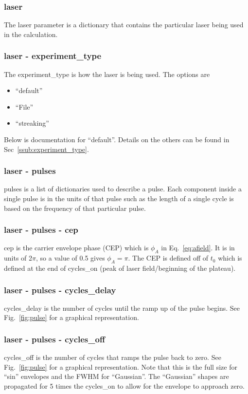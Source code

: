 \documentclass{article}
\begin{document}
\subsubsection{laser}
\label{ssub:laser_parameter}
The laser parameter is a dictionary that contains the particular laser being used in the calculation.

\subsubsection{laser - experiment\_type}
The experiment\_type is how the laser is being used. The options are
\begin{itemize}
  \item ``default''
  \item ``File''
  \item ``streaking''
\end{itemize}
Below is documentation for ``default''. Details on the others can be found in Sec~\ref{ssub:experiment_type}.

\subsubsection{laser - pulses}
pulses is a list of dictionaries used to describe a pulse. Each component inside a single pulse is in the units of that pulse such as the length of a single cycle is based on the frequency of that particular pulse.

\subsubsection{laser - pulses - cep}
cep is the carrier envelope phase (CEP) which is $\phi_A$ in Eq.~\ref{eq:afield}. It is in units of 2$\pi$, so a value of 0.5 gives $\phi_A=\pi$. The CEP is defined off of $t_0$ which is defined at the end of cycles\_on (peak of laser field/beginning of the plateau).

\subsubsection{laser - pulses - cycles\_delay}
cycles\_delay is the number of cycles until the ramp up of the pulse begins. See Fig.~\ref{fig:pulse} for a graphical representation.

\subsubsection{laser - pulses - cycles\_off}
cycles\_off is the number of cycles that ramps the pulse back to zero. See Fig.~\ref{fig:pulse} for a graphical representation. Note that this is the full size for ``sin'' envelopes and the FWHM for ``Gaussian''. The ``Gaussian'' shapes are propagated for 5 times the cycles\_on to allow for the envelope to approach zero.
\end{document}
